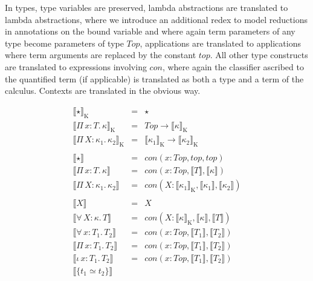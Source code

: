 \documentclass{article}
\newcommand{\abs}[4]{{#1}\, #2\! : \! #3.\, #4}
\newcommand{\interp}[1]{\llbracket #1 \rrbracket}
\begin{document}
In types, type variables are preserved, lambda abstractions are translated to
lambda abstractions, where we introduce an additional redex to model reductions
in annotations on the bound variable and where again term parameters of any type
become parameters of type \(\mathit{Top}\), applications are translated to
applications where term arguments are replaced by the constant \(\mathit{top}\).
All other type constructs are translated to expressions involving
\(\mathit{con}\), where again the classifier ascribed to the quantified term (if
applicable) is translated as both a type and a term of the calculus.
Contexts are translated in the obvious way.

\begin{figure}
  \[
    \begin{array}{lcl}
      \interp{\star}_{\text{K}}
      & = 
      & \star
      \\ \interp{\abs{\Pi}{x}{T}{\kappa}}_{\text{K}}
      & =
      & \mathit{Top} \to \interp{\kappa}_{\text{K}}
      \\ \interp{\abs{\Pi}{X}{\kappa_1}{\kappa_2}}_{\text{K}}
      & =
      & \interp{\kappa_1}_{\text{K}} \to \interp{\kappa_2}_{\text{K}}
      \\ \\
      \interp{\star}
      & =
      & \mathit{con}(x\!:\!\mathit{Top},\mathit{top},\mathit{top})
      \\ \interp{\abs{\Pi}{x}{T}{\kappa}}
      & =
      & \mathit{con}(x\!:\!\mathit{Top},\interp{T},\interp{\kappa})
      \\ \interp{\abs{\Pi}{X}{\kappa_1}{\kappa_2}}
      & =
      & \mathit{con}(X\!:\!\interp{\kappa_1}_{\text{K}}, \interp{\kappa_1},\interp{\kappa_2})
      \\ \\
      \interp{X}
      & =
      & X
      \\ \interp{\abs{\forall}{X}{\kappa}{T}}
      & =
      & \mathit{con}(X\!:\!\interp{\kappa}_{\text{K}},\interp{\kappa},\interp{T})
      \\ \interp{\abs{\forall}{x}{T_1}{T_2}}
      & =
      & \mathit{con}(x\!:\!\mathit{Top},\interp{T_1},\interp{T_2})
      \\ \interp{\abs{\Pi}{x}{T_1}{T_2}}
      & =
      & \mathit{con}(x\!:\!\mathit{Top},\interp{T_1},\interp{T_2})
      \\ \interp{\abs{\iota}{x}{T_1}{T_2}}
      & =
      & \mathit{con}(x\!:\!\mathit{Top},\interp{T_1},\interp{T_2})
      \\ \interp{\{ t_1 \simeq t_2 \}}

\end{array}\]
\end{figure}
\end{document}
